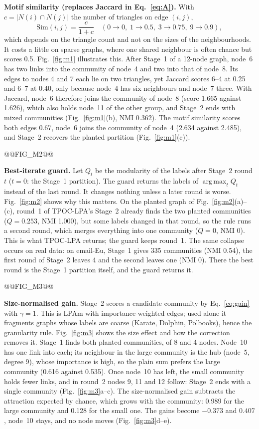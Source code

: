 \documentclass[conference]{IEEEtran}
\DeclareMathOperator*{\argmax}{arg\,max}
\begin{document}
\textbf{Motif similarity (replaces Jaccard in Eq.~\eqref{eq:A}).} With $c=|N(i)\cap N(j)|$ the number of triangles on edge $(i,j)$,
\begin{equation}
\mathrm{Sim}(i,j)=\frac{c}{1+c}\quad(0\to0,\;1\to0.5,\;3\to0.75,\;9\to0.9),\label{eq:motif}
\end{equation}
which depends on the triangle count and not on the sizes of the neighbourhoods. It costs a little on sparse graphs, where one shared neighbour is often chance but scores 0.5. Fig.~\ref{fig:m1} illustrates this. After Stage~1 of a 12-node graph, node~6 has two links into the community of node~4 and two into that of node~8. Its edges to nodes 4 and 7 each lie on two triangles, yet Jaccard scores 6--4 at 0.25 and 6--7 at 0.40, only because node~4 has six neighbours and node~7 three. With Jaccard, node~6 therefore joins the community of node~8 (score 1.665 against 1.626), which also holds node~11 of the other group, and Stage~2 ends with mixed communities (Fig.~\ref{fig:m1}(b), NMI 0.362). The motif similarity scores both edges 0.67, node~6 joins the community of node~4 (2.634 against 2.485), and Stage~2 recovers the planted partition (Fig.~\ref{fig:m1}(c)).

@@FIG_M2@@

\textbf{Best-iterate guard.} Let $Q_t$ be the modularity of the labels after Stage~2 round $t$ ($t=0$: the Stage~1 partition). The guard returns the labels of $\argmax_tQ_t$ instead of the last round. It changes nothing unless a later round is worse. Fig.~\ref{fig:m2} shows why this matters. On the planted graph of Fig.~\ref{fig:m2}(a)--(c), round~1 of TPOC-LPA's Stage~2 already finds the two planted communities ($Q=0.253$, NMI 1.000), but some labels changed in that round, so the rule runs a second round, which merges everything into one community ($Q=0$, NMI 0). This is what TPOC-LPA returns; the guard keeps round~1. The same collapse occurs on real data: on email-Eu, Stage~1 gives 335 communities (NMI 0.54), the first round of Stage~2 leaves 4 and the second leaves one (NMI 0). There the best round is the Stage~1 partition itself, and the guard returns it.

@@FIG_M3@@

\textbf{Size-normalised gain.} Stage~2 scores a candidate community by Eq.~\eqref{eq:gain} with $\gamma=1$. This is LPAm with importance-weighted edges; used alone it fragments graphs whose labels are coarse (Karate, Dolphin, Polbooks), hence the granularity rule. Fig.~\ref{fig:m3} shows the size effect and how the correction removes it. Stage~1 finds both planted communities, of 8 and 4 nodes. Node~10 has one link into each; its neighbour in the large community is the hub (node~5, degree 9), whose importance is high, so the plain sum prefers the large community (0.616 against 0.535). Once node~10 has left, the small community holds fewer links, and in round~2 nodes 9, 11 and 12 follow: Stage~2 ends with a single community (Fig.~\ref{fig:m3}a--c). The size-normalised gain subtracts the attraction expected by chance, which grows with the community: 0.989 for the large community and 0.128 for the small one. The gains become $-0.373$ and $0.407$, node~10 stays, and no node moves (Fig.~\ref{fig:m3}d--e).
\end{document}
